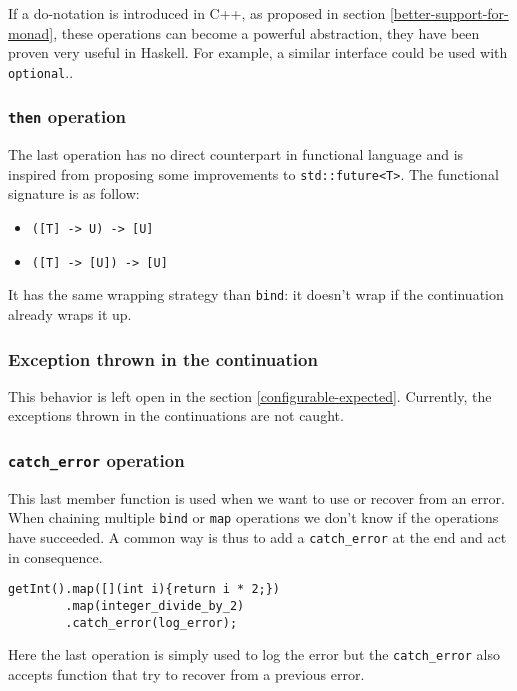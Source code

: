 \documentclass[a4paper,10pt]{article}
\newcommand{\cpp}[1]{\lstinline{#1}}
\begin{document}
If a do-notation is introduced in C++, as proposed in section \ref{better-support-for-monad}, these operations can become a powerful abstraction, they have been proven very useful in Haskell. For example, a similar interface could be used with \cpp{optional}..

\subsubsection{\cpp{then} operation}

The last operation has no direct counterpart in functional language and is inspired from \cite{ImprovementsAsync} proposing some improvements to \cpp{std::future<T>}. The functional signature is as follow:

\begin{itemize}
\item \cpp{([T] -> U) -> [U]}
\item \cpp{([T] -> [U]) -> [U]}
\end{itemize}

It has the same wrapping strategy than \cpp{bind}: it doesn't wrap if the continuation already wraps it up.

\subsubsection{Exception thrown in the continuation}

This behavior is left open in the section \ref{configurable-expected}. Currently, the exceptions thrown in the continuations are not caught.

\subsubsection{\cpp{catch_error} operation}

This last member function is used when we want to use or recover from an error. When chaining multiple \cpp{bind} or \cpp{map} operations we don't know if the operations have succeeded. A common way is thus to add a \cpp{catch_error} at the end and act in consequence.

\begin{lstlisting}
getInt().map([](int i){return i * 2;})
        .map(integer_divide_by_2)
        .catch_error(log_error);
\end{lstlisting}

\noindent
Here the last operation is simply used to log the error but the \cpp{catch_error} also accepts function that try to recover from a previous error.
\end{document}
